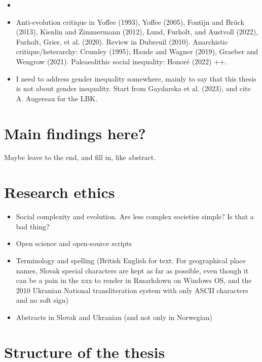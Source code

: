 \documentclass[
  12pt,
]{book}
\providecommand{\tightlist}{%
  \setlength{\itemsep}{0pt}\setlength{\parskip}{0pt}}
\begin{document}
\begin{itemize}
\tightlist
\item
\end{itemize}

\begin{itemize}
\tightlist
\item
  Anti-evolution critique in Yoffee (1993), Yoffee (2005), Fontijn and Brück (2013), Kienlin and Zimmermann (2012), Lund, Furholt, and Austvoll (2022), Furholt, Grier, et al. (2020). Review in Dubreuil (2010). Anarchistic critique/heterarchy: Crumley (1995), Haude and Wagner (2019), Graeber and Wengrow (2021). Paleaeolithic social inequality: Honoré (2022) ++.
\item
  I need to address gender inequality somewhere, mainly to say that this thesis is not about gender inequality. Start from Gaydarska et al. (2023), and cite A. Augereau for the LBK.
\end{itemize}

\hypertarget{main-findings-here}{%
\section{Main findings here?}\label{main-findings-here}}

Maybe leave to the end, and fill in, like abstract.

\hypertarget{research-ethics}{%
\section{Research ethics}\label{research-ethics}}

\begin{itemize}
\item
  Social complexity and evolution. Are less complex societies simple? Is that a bad thing?
\item
  Open science and open-source scripts
\item
  Terminology and spelling (British English for text. For geographical place names, Slovak special characters are kept as far as possible, even though it can be a pain in the xxx to render in Rmarkdown on Windows OS, and the 2010 Ukranian National transliteration system with only ASCII characters and no soft sign)
\item
  Abstracts in Slovak and Ukranian (and not only in Norwegian)
\end{itemize}

\hypertarget{structure-of-the-thesis}{%
\section{Structure of the thesis}\label{structure-of-the-thesis}}
\end{document}
